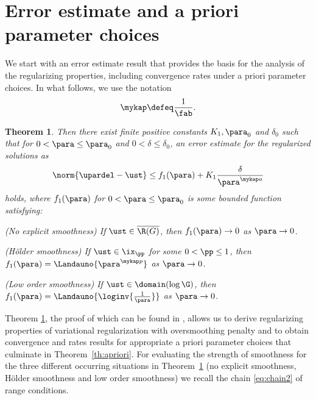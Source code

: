 \documentclass[10pt]{article}
\newtheorem{theorem}{Theorem}
\theoremstyle{definition}
\begin{document}
\section{Error estimate and a priori parameter choices}
\label{sec:apriori_parameter_choices}
%


%
We start with an error estimate result that provides the basis for the analysis of the regularizing properties, including convergence rates under a priori parameter choices. In what follows, we use the notation
%
\begin{align}
\mykap \defeq \frac{1}{\fab}.
\label{eq:mykapdef}
\end{align}
%
%
\begin{theorem}
\label{th:upardel-esti}
\mainassump
Then there exist finite positive constants $ K_1, \para_0 $ and $ \delta_0 $ such that for $ 0 < \para \le \para_0 $ and $ 0 < \delta \le \delta_0 $,
an error estimate for the regularized solutions as
%
\begin{align}
\label{eq:fin}
\norm{\upardel -\ust} \le f_1(\para) + K_1 \frac{\delta}{\para^{\mykap a}}
\end{align}
%
holds, where $f_1(\para)$ for $ 0 < \para \le \para_0 $ is some bounded function satisfying:
%
\begin{mylist_indent}
\item (No explicit smoothness)
If $ \ust \in \overline{\R(G)} $, then $ f_1(\para) \to 0 $ as $ \para \to 0 $.
\item (H\"older smoothness)
If $ \ust \in \ix_\pp $ for some $ 0 < \pp \le 1 $, then
$ f_1(\para) = \Landauno{\para^{\mykap p}} $ as $ \para \to 0 $.
\item (Low order smoothness)
If $ \ust \in \domain(\log \G) $, then
$ f_1(\para) = \Landauno{\loginv{\frac{1}{\para}}} $ as $ \para \to 0 $.
\end{mylist_indent}
\end{theorem}
%

Theorem \ref{th:upardel-esti}, the proof of which can be found in \cite{PlatoIndien22}, allows us to derive regularizing properties
of variational regularization with oversmoothing penalty and to obtain convergence and rates results for appropriate a priori parameter choices that
culminate in Theorem~\ref{th:apriori}.
For evaluating the strength of smoothness for the three different occurring situations in Theorem~\ref{th:upardel-esti}
(no explicit smoothness, H\"older smoothness and low order smoothness) we recall the chain \eqref{eq:chain2} of range conditions.
\end{document}
